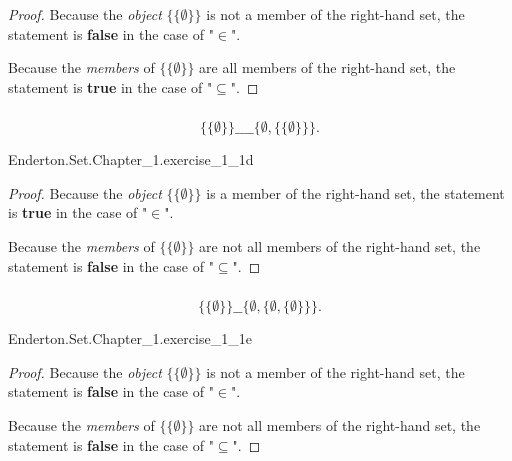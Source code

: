 \documentclass{report}
\begin{document}
  \begin{proof}
    Because the \textit{object} $\{\{\emptyset\}\}$ is not a member of the
      right-hand set, the statement is \textbf{false} in the case of "$\in$".

    Because the \textit{members} of $\{\{\emptyset\}\}$ are all members of the
      right-hand set, the statement is \textbf{true} in the case of
      "$\subseteq$".
  \end{proof}

\subsubsection{}%

  $$\{\{\emptyset\}\} \_\_\_\_ \{\emptyset, \{\{\emptyset\}\}\}.$$

    {Enderton.Set.Chapter\_1.exercise\_1\_1d}

  \begin{proof}
    Because the \textit{object} $\{\{\emptyset\}\}$ is a member of the
      right-hand set, the statement is \textbf{true} in the case of "$\in$".

    Because the \textit{members} of $\{\{\emptyset\}\}$ are not all members of
      the right-hand set, the statement is \textbf{false} in the case of
      "$\subseteq$".
  \end{proof}

\subsubsection{}%

  $$\{\{\emptyset\}\} \_\_ \{\emptyset, \{\emptyset, \{\emptyset\}\}\}.$$

    {Enderton.Set.Chapter\_1.exercise\_1\_1e}

  \begin{proof}
    Because the \textit{object} $\{\{\emptyset\}\}$ is not a member of the
      right-hand set, the statement is \textbf{false} in the case of "$\in$".

    Because the \textit{members} of $\{\{\emptyset\}\}$ are not all members of
      the right-hand set, the statement is \textbf{false} in the case of
      "$\subseteq$".
  \end{proof}

\subsection{}%
\end{document}
